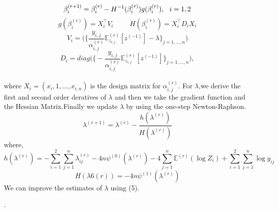 \documentclass[12pt]{article}%
\theoremstyle{definition}
\theoremstyle{remark}
\begin{document}
{\begin{equation*}
   \beta_i^{(r+1)}=\beta_i^{(r)} - H^{-1}(\beta_i^{(r)})g(\beta_i^{(r)}),\hspace{0.25cm}  i=1,2
\end{equation*}
\begin{equation*}
	g(\beta_i^{(r)})= X_i^{\top}V_i  \hspace{1cm} H(\beta_i^{(r)})= X_i^{\top}D_iX_i
\end{equation*}
\begin{equation*}
	V_i= \bigg(\bigg\{\frac{y_{i,j}}{\alpha_{i,j}^{(r)} }\mathbb{E}_{z_{i,j}}^{(r)}[z^{(-1)}]-\lambda\bigg\}_{j=1,...,n}\bigg)
\end{equation*}
\begin{equation*}
		D_i= diag\bigg(\bigg\{-\frac{y_{i,j}}{\alpha_{i,j}^{(r)} }\mathbb{E}_{z_{i,j}}^{(r)}[z^{(-1)}]\bigg\}_{j=1,...,n}\bigg),
\end{equation*}\\
where $X_i = (x_i,1, . . . , x_{i,n})$ is the design matrix for $\alpha_{i,j}^{(r)}$.
For $\lambda$,we derive the first and second order deratives of $\lambda$ and then we take the gradient function and the Hessian Matrix.Finally we update $\lambda$ by using the one-step Newton-Raphson.
\begin{equation}
	\lambda^{(r+1)}=\lambda^{(r)}-\frac{h(\lambda^{(r)})}{H(\lambda^{(r)})}
\end{equation}
where,
\begin{equation*}
h(\lambda^{(r)})	=-\sum _{i=1}^2\sum _{j=1}^n\lambda_{ij}^{(r)}-4n\psi^{(0)}(\lambda^{(r)})-4\sum _{j=1}^n\mathbb{E}^{(r)}(\log Z_i)+\sum _{i=1}^2\sum _{j=1}^n\log y_{ij}
\end{equation*}
\begin{equation*}
	H(\lambda6{(r)})=-4n\psi^{(1)}(\lambda^{(r)})
\end{equation*}
We can improve the estimates of $\lambda$ using (5).


. 
}
\end{document}

